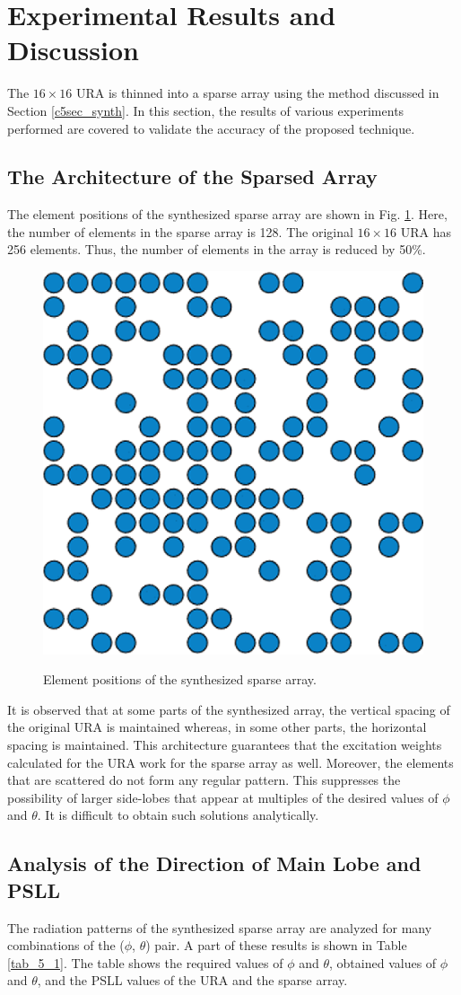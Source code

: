 \section{Experimental Results and Discussion}\label{c5sec_res}
The $16\times 16$ URA is thinned into a sparse array using the method discussed in Section \ref{c5sec_synth}. In this section, the results of various experiments performed are covered to validate the accuracy of the proposed technique.

\subsection{The Architecture of the Sparsed Array}
The element positions of the synthesized sparse array are shown in Fig. \ref{fig_5_7}. Here, the number of elements in the sparse array is 128. The original $16\times 16$ URA has 256 elements. Thus, the number of elements in the array is reduced by 50\%.

\begin{figure}
  \centering
  \includegraphics[width=0.4\linewidth]{Fig-naun_7.eps}\\
  \caption{Element positions of the synthesized sparse array.} \label{fig_5_7}
\end{figure}

It is observed that at some parts of the synthesized array, the vertical spacing of the original URA is maintained whereas, in some other parts, the horizontal spacing is maintained. This architecture guarantees that the excitation weights calculated for the URA work for the sparse array as well. Moreover, the elements that are scattered do not form any regular pattern. This suppresses the possibility of larger side-lobes that appear at multiples of the desired values of $\phi$ and $\theta$. It is difficult to obtain such solutions analytically.

\subsection{Analysis of the Direction of Main Lobe and PSLL}
The radiation patterns of the synthesized sparse array are analyzed for many combinations of the ($\phi$, $\theta$) pair. A part of these results is shown in Table \ref{tab_5_1}. The table shows the required values of $\phi$ and $\theta$, obtained values of $\phi$ and $\theta$, and the PSLL values of the URA and the sparse array.

